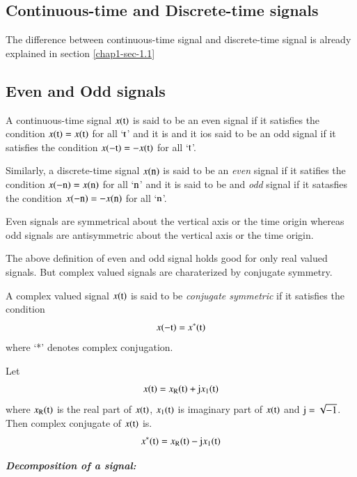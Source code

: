 \subsection{Continuous-time and Discrete-time signals}\label{chap1-subset-1.6.1}

The difference between continuous-time signal and discrete-time signal is already explained in section \ref{chap1-sec-1.1}

\subsection{Even and Odd signals}\label{chap1-subset-1.6.2}

A continuous-time signal $x(\textrm{t})$ is said to be an even signal if it satisfies the condition $x(\textrm{t})= x(\textrm{t})$ for all `$\textrm{t}$' and it is and it ios said to be an odd signal if it satisfies the condition $x(-\textrm{t})=-x(\textrm{t})$ for all `$\textrm{t}$'.

Similarly, a discrete-time signal $x(\textrm{n})$ is said to be an \textit{even} signal if it satifies the condition $x(-\textrm{n}) = x(\textrm{n})$ for all `$\textrm{n}$' and it is said to be and \textit{odd} signal if it satasfies the condition  $x(-\textrm{n})=-x(\textrm{n})$ for all `$\textrm{n}$'.

Even signals are symmetrical about the vertical axis or the time origin whereas odd signals are antisymmetric about the vertical axis or the time origin.

The above definition of even and odd signal holds good for only real valued signals. But complex valued signals are charaterized by conjugate symmetry.

A complex valued signal $x(\textrm{t})$ is said to be \textit{conjugate symmetric} if it satisfies the condition
\begin{equation}\label{chap1-eq-1.42}
x(-\textrm{t}) =x^{*}(\textrm{t})
\end{equation}
where `*' denotes complex conjugation.

Let
\begin{equation}\label{chap1-eq-1.43}
x(\textrm{t})= x_{\textrm{R}}(\textrm{t}) + \textrm{j} x_{1}(\textrm{t})
\end{equation}
where $x_{\textrm{R}}(\textrm{t})$ is the real part of $x(\textrm{t})$, $x_{1}(\textrm{t})$ is imaginary part of $x(\textrm{t})$ and $\textrm{j} = \sqrt{-1}$.
Then complex conjugate of $x(\textrm{t})$ is.
\begin{equation}\label{chapp1-eq-1.44}
x^{*}(\textrm{t}) = x_{\textrm{R}}(\textrm{t})-\textrm{j} x_{1}(\textrm{t})
\end{equation}

{\it\bfseries  Decomposition of a signal:}

